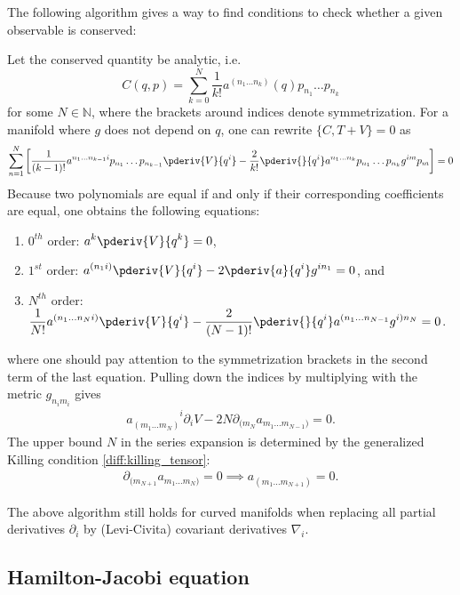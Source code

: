     The following algorithm gives a way to find conditions to check whether a given observable is conserved:
    \begin{method}
        Let the conserved quantity be analytic, i.e. \[C(q, p) = \sum_{k=0}^N\frac{1}{k!}a^{(n_1\ldots n_k)}(q)p_{n_1}\ldots p_{n_k}\] for some $N\in\mathbb{N}$, where the brackets around indices denote symmetrization. For a manifold where $g$ does not depend on $q$, one can rewrite $\{C, T+V\} = 0$ as \[\sum_{n = 1}^N\left[\frac{1}{(k-1)!}a^{n_1\ldots n_{k-1}i}p_{n_1}\ldots p_{n_{k-1}}\pderiv{V}{q^i} - \frac{2}{k!}\pderiv{}{q^i}a^{n_1\ldots n_k}p_{n_1}\ldots p_{n_k}g^{im}p_m\right] = 0\] Because two polynomials are equal if and only if their corresponding coefficients are equal, one obtains the following equations:
        \begin{enumerate}
            \item $0^{th}$ order: $\displaystyle a^k\pderiv{V}{q^k} = 0$,
            \item $1^{st}$ order: $\displaystyle a^{(n_1i)}\pderiv{V}{q^i} - 2\pderiv{a}{q^i}g^{in_1} = 0$, and
            \item $N^{th}$ order: $\displaystyle \frac{1}{N!}a^{(n_1\ldots n_Ni)}\pderiv{V}{q^i} - \frac{2}{(N-1)!}\pderiv{}{q^i}a^{(n_1\ldots n_{N-1}}g^{i)n_N} = 0$.
        \end{enumerate}
        where one should pay attention to the symmetrization brackets in the second term of the last equation. Pulling down the indices by multiplying with the metric $g_{n_im_i}$ gives
        \begin{gather}
            a_{(m_1\ldots m_N)}^{\phantom{(m_1\ldots m_N)}i}\partial_iV - 2N\partial_{(m_N}a_{m_1\ldots m_{N-1})} = 0.
        \end{gather}
        The upper bound $N$ in the series expansion is determined by the generalized Killing condition \ref{diff:killing_tensor}:
        \begin{gather}
            \partial_{(m_{N+1}}a_{m_1\ldots m_N)} = 0\implies a_{(m_1\ldots m_{N+1})} = 0.
        \end{gather}
    \end{method}
    \begin{remark}
        The above algorithm still holds for curved manifolds when replacing all partial derivatives $\partial_i$ by (Levi-Civita) covariant derivatives $\nabla_i$.
    \end{remark}

\subsection{Hamilton-Jacobi equation}\label{section:hamilton_jacobi}

